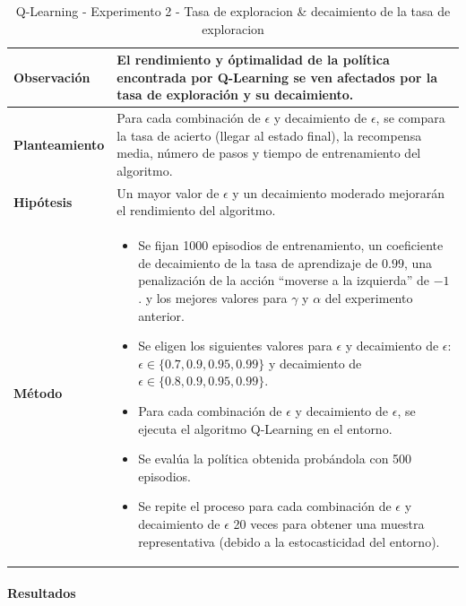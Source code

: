 \begin{table}[H]
    \centering
    \begin{tabularx}{\textwidth}{|p{4cm}|X|} %
        \hline %
        \textbf{Observación} & El rendimiento y óptimalidad de la política encontrada por Q-Learning se ven afectados por la tasa de exploración y su decaimiento. 
        \\ \hline 
        \textbf{Planteamiento} & Para cada combinación de \(\epsilon\) y decaimiento de \(\epsilon\), se compara la tasa de acierto (llegar al estado final), la recompensa media, número de pasos y tiempo de entrenamiento del algoritmo.
        \\ \hline 
        \textbf{Hipótesis} & Un mayor valor de \(\epsilon\) y un decaimiento moderado mejorarán el rendimiento del algoritmo.
        \\ \hline 
        \textbf{Método} & 
        \begin{itemize}
            \item Se fijan 1000 episodios de entrenamiento,  un coeficiente de decaimiento de la tasa de aprendizaje de $0.99$, una penalización de la acción ``moverse a la izquierda'' de $-1$. y los mejores valores para \(\gamma\) y $\alpha$ del experimento anterior.
            \item Se eligen los siguientes valores para \(\epsilon\) y decaimiento de \(\epsilon\): \(\epsilon \in \{0.7, 0.9, 0.95, 0.99\}\) y decaimiento de \(\epsilon \in \{0.8, 0.9, 0.95, 0.99\}\).
            \item Para cada combinación de \(\epsilon\) y decaimiento de \(\epsilon\), se ejecuta el algoritmo Q-Learning en el entorno.
            \item Se evalúa la política obtenida probándola con 500 episodios.
            \item Se repite el proceso para cada combinación de \(\epsilon\) y decaimiento de \(\epsilon\) 20 veces para obtener una muestra representativa (debido a la estocasticidad del entorno).
        \end{itemize}
        \\ \hline
    \end{tabularx}
    \caption{Q-Learning - Experimento 2 - Tasa de exploracion \& decaimiento de la tasa de exploracion}
    \label{tab:diseñoQLEarningExp2}
\end{table}
\newpage
\paragraph{Resultados}

